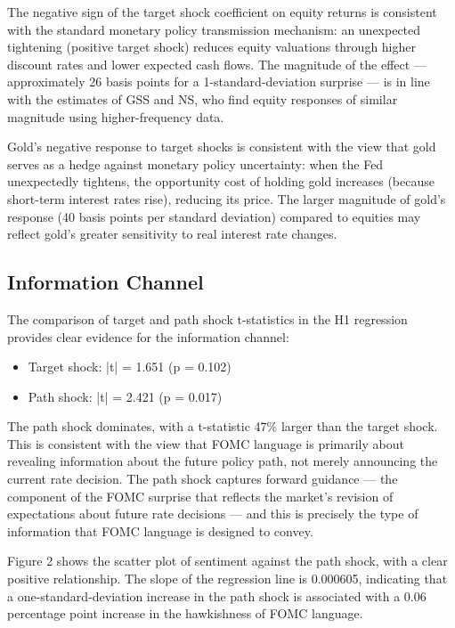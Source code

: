 \documentclass[12pt]{article}
\begin{document}
The negative sign of the target shock coefficient on equity returns is consistent with the standard monetary policy transmission mechanism: an unexpected tightening (positive target shock) reduces equity valuations through higher discount rates and lower expected cash flows. The magnitude of the effect --- approximately 26 basis points for a 1-standard-deviation surprise --- is in line with the estimates of GSS and NS, who find equity responses of similar magnitude using higher-frequency data.

Gold's negative response to target shocks is consistent with the view that gold serves as a hedge against monetary policy uncertainty: when the Fed unexpectedly tightens, the opportunity cost of holding gold increases (because short-term interest rates rise), reducing its price. The larger magnitude of gold's response (40 basis points per standard deviation) compared to equities may reflect gold's greater sensitivity to real interest rate changes.

\subsection{Information Channel}

The comparison of target and path shock t-statistics in the H1 regression provides clear evidence for the information channel:

\begin{itemize}
\item Target shock: |t| = 1.651 (p = 0.102)
\item Path shock: |t| = 2.421 (p = 0.017)
\end{itemize}

The path shock dominates, with a t-statistic 47\% larger than the target shock. This is consistent with the view that FOMC language is primarily about revealing information about the future policy path, not merely announcing the current rate decision. The path shock captures forward guidance --- the component of the FOMC surprise that reflects the market's revision of expectations about future rate decisions --- and this is precisely the type of information that FOMC language is designed to convey.

Figure 2 shows the scatter plot of sentiment against the path shock, with a clear positive relationship. The slope of the regression line is 0.000605, indicating that a one-standard-deviation increase in the path shock is associated with a 0.06 percentage point increase in the hawkishness of FOMC language.
\end{document}
